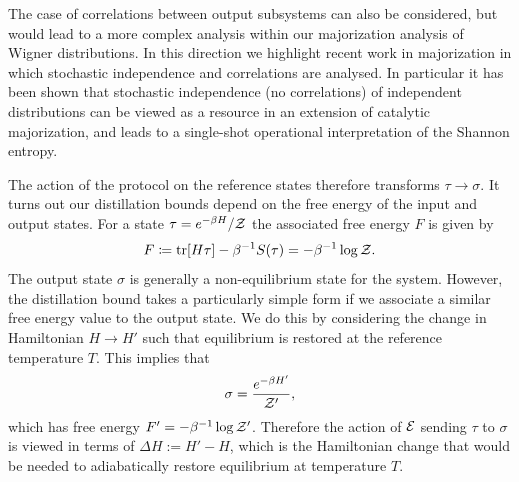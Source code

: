 \documentclass[pra,
aps,
twocolumn,
superscriptaddress,
groupedaddress,
nofootinbib,
reprint
]{revtex4-1}
\begin{document}
The case of correlations between output subsystems can also be considered, but would lead to a more complex analysis within our majorization analysis of Wigner distributions. In this direction we highlight recent work in majorization in which stochastic independence and correlations are analysed. In particular it has been shown that stochastic independence (no correlations) of independent distributions can be viewed as a resource in an extension of catalytic majorization, and leads to a single-shot operational interpretation of the Shannon entropy.

The action of the protocol on the reference states therefore transforms $\tau \rightarrow \sigma$. It turns out our distillation bounds depend on the free energy of the input and output states. For a state $\tau = e^{-\beta H}/\mathcal{Z}$ the associated free energy $F$ is given by
\begin{equation}
	F \coloneqq {\rm{tr}}[H \tau] - \beta^{-1}S(\tau) = -\beta^{-1}\log{\mathcal{Z}}.
\end{equation}
The output state $\sigma$ is generally a non-equilibrium state for the system. However, the distillation bound takes a particularly simple form if we associate a similar free energy value to the output state. We do this by considering the change in Hamiltonian $H \rightarrow H'$ such that equilibrium is restored at the reference temperature $T$. This implies that 
\begin{equation}
\sigma = \frac{e^{-\beta H'}}{\mathcal{Z}'},
\end{equation}
which has free energy $F' = -\beta^{-1} \log \mathcal{Z}'$. Therefore the action of $\mathcal{E}$ sending $\tau$ to $\sigma$ is viewed in terms of $\Delta H := H'-H$, which is the Hamiltonian change that would be needed to adiabatically restore equilibrium at temperature $T$. 
\end{document}
